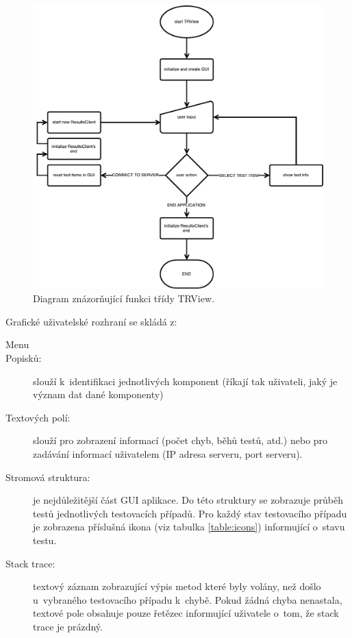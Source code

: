       \begin{figure}
	\includegraphics[width=\textwidth, height=\textheight, keepaspectratio, center]{obrazky-figures/trview_trview_flowchart.pdf}
	\caption{Diagram znázorňující funkci třídy TRView.}
	\label{fig:trview_flowchart}
      \end{figure}


      \noindent Grafické uživatelské rozhraní se skládá z:
      \begin{description}
	 \item[Menu] 
	 \item[Popisků:] slouží k~identifikaci jednotlivých komponent (říkají tak uživateli, jaký je význam dat dané komponenty)
	 \item[Textových polí:] slouží pro zobrazení informací (počet chyb, běhů testů, atd.) nebo pro zadávání informací uživatelem (IP adresa serveru, port serveru).
	 \item[Stromová struktura:] je nejdůležitější část GUI aplikace. Do této struktury se zobrazuje průběh testů jednotlivých testovacích případů. Pro každý stav testovacího případu je zobrazena příslušná ikona (viz tabulka \ref{table:icons}) informující o~stavu testu.
	 \item[Stack trace:] textový záznam zobrazující výpis metod které byly volány, než došlo u~vybraného testovacího případu k~chybě. Pokud žádná chyba nenastala, textové pole obsahuje pouze řetězec informující uživatele o~tom, že stack trace je prázdný.
      \end{description}
      
